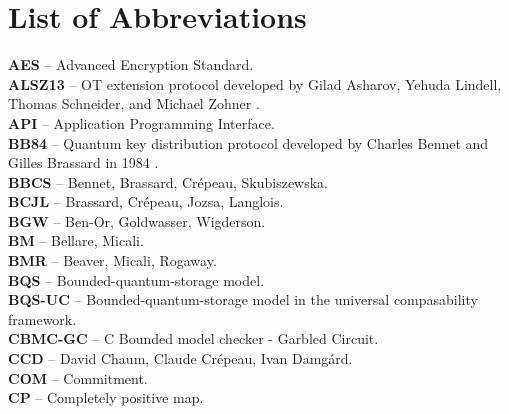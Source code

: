 \chapter*{List of Abbreviations}


\textbf{AES} -- Advanced Encryption Standard.
\vspace{0.5cm}\\
\textbf{ALSZ13} -- OT extension protocol developed by Gilad Asharov, Yehuda Lindell, Thomas Schneider, and Michael Zohner \cite{ALSZ13}.
\vspace{0.5cm}\\
\textbf{API} -- Application Programming Interface.
\vspace{0.5cm}\\
\textbf{BB84} -- Quantum key distribution protocol developed by Charles Bennet and Gilles Brassard in 1984 \cite{BB84}.
\vspace{0.5cm}\\
\textbf{BBCS} -- Bennet, Brassard, Crépeau, Skubiszewska.
\vspace{0.5cm}\\
\textbf{BCJL} -- Brassard, Crépeau, Jozsa, Langlois.
\vspace{0.5cm}\\
\textbf{BGW} -- Ben-Or, Goldwasser, Wigderson.
\vspace{0.5cm}\\
\textbf{BM} -- Bellare, Micali.
\vspace{0.5cm}\\
\textbf{BMR} -- Beaver, Micali, Rogaway.
\vspace{0.5cm}\\
\textbf{BQS} -- Bounded-quantum-storage model.
\vspace{0.5cm}\\
\textbf{BQS-UC} -- Bounded-quantum-storage model in the universal compasability framework.
\vspace{0.5cm}\\
\textbf{CBMC-GC} -- C Bounded model checker - Garbled Circuit.
\vspace{0.5cm}\\
\textbf{CCD} -- David Chaum, Claude Crépeau, Ivan Damg\'{a}rd.
\vspace{0.5cm}\\
\textbf{COM} -- Commitment.
\vspace{0.5cm}\\
\textbf{CP} -- Completely positive map.
\vspace{0.5cm}\\
